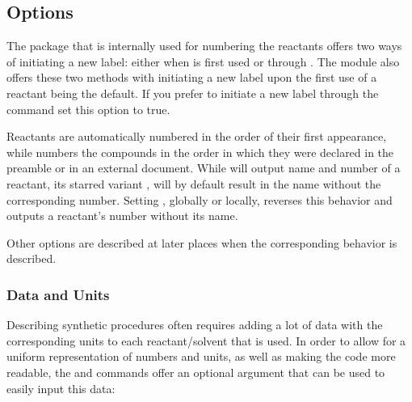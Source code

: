 \documentclass{chemmacros-manual}
\begin{document}
\subsection{Options}
\begin{options}
    The  package that is internally used for numbering the
    reactants offers two ways of initiating a new label: either when 
    is first used or through .  The  module
    also offers these two methods with initiating a new label upon the first
    use of a reactant being the default.   If you prefer to initiate a
    new label through the  command set this option to
    true.

    Reactants are automatically numbered in the order of their first
    appearance, while  numbers the compounds in the order in
    which they were declared in the preamble or in an external document.
    While  will output name and number of a reactant, its starred variant 
     , will by default result in the name without the corresponding number. 
     Setting , globally or locally, reverses this behavior and outputs
      a reactant's number without its name.
\end{options}
Other options are described at later places when the corresponding behavior is
described.

\subsubsection{Data and Units}

Describing synthetic procedures often requires adding a lot of data with the
corresponding units to each reactant/solvent that is used. In order to allow for a
uniform representation of numbers and units, as well as making the code more
readable, the  and  commands offer an optional argument 
that can be used to easily input this data: 

\begin{commands}
\end{commands}
\end{document}
